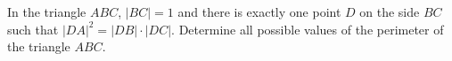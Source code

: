 In the triangle $ABC$, $| BC | = 1$ and there is exactly one point $D$ on the  side  $BC$  such that $|DA|^2 =  |DB| \cdot |DC|$. Determine all possible values of the perimeter of  the triangle $ABC$.